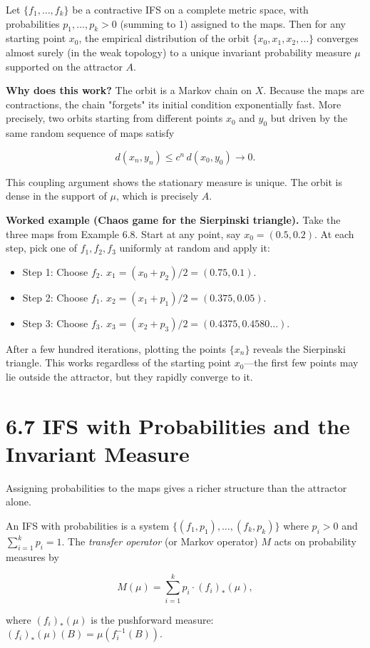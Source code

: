 \begin{theorem}
Let $\{ f_1, \ldots, f_k\} $ be a contractive IFS on a complete metric space, with probabilities $p_1, \ldots, p_k > 0$ (summing to 1) assigned to the maps. Then for any starting point $x_0$, the empirical distribution of the orbit $\{ x_0, x_1, x_2, \ldots\} $ converges almost surely (in the weak topology) to a unique invariant probability measure $\mu$ supported on the attractor $A$.

\textbf{Why does this work?} The orbit is a Markov chain on $X$. Because the maps are contractions, the chain "forgets" its initial condition exponentially fast. More precisely, two orbits starting from different points $x_0$ and $y_0$ but driven by the same random sequence of maps satisfy

\[
d(x_n, y_n) \le c^n \, d(x_0, y_0) \to 0.
\]

This coupling argument shows the stationary measure is unique. The orbit is dense in the support of $\mu$, which is precisely $A$.

\textbf{Worked example (Chaos game for the Sierpinski triangle).} Take the three maps from Example 6.8. Start at any point, say $x_0 = (0.5, 0.2)$. At each step, pick one of $f_1, f_2, f_3$ uniformly at random and apply it:
\end{theorem}

\begin{itemize}
  \item Step 1: Choose $f_2$. $x_1 = (x_0 + p_2)/2 = (0.75, 0.1)$.
  \item Step 2: Choose $f_1$. $x_2 = (x_1 + p_1)/2 = (0.375, 0.05)$.
  \item Step 3: Choose $f_3$. $x_3 = (x_2 + p_3)/2 = (0.4375, 0.4580\ldots)$.
\end{itemize}

After a few hundred iterations, plotting the points $\{ x_n\} $ reveals the Sierpinski triangle. This works regardless of the starting point $x_0$—the first few points may lie outside the attractor, but they rapidly converge to it.

\section{6.7 IFS with Probabilities and the Invariant Measure}

Assigning probabilities to the maps gives a richer structure than the attractor alone.

\begin{definition}
An IFS with probabilities is a system $\{ (f_1, p_1), \ldots, (f_k, p_k)\} $ where $p_i > 0$ and $\sum_{i=1}^k p_i = 1$. The \textit{transfer operator} (or Markov operator) $M$ acts on probability measures by

\[
M(\mu) = \sum_{i=1}^{k} p_i \cdot (f_i)_{*}(\mu),
\]

where $(f_i)_{*}(\mu)$ is the pushforward measure: $(f_i)_{*}(\mu)(B) = \mu(f_i^{-1}(B))$.
\end{definition}

